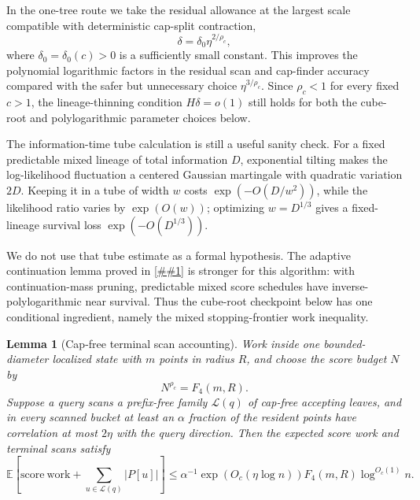 \documentclass[10pt]{article}
\newcommand{\cref}[1]{\ref{##1}}
\newtheorem{lemma}[theorem]{Lemma}
\theoremstyle{definition}
\newcommand{\E}{\mathbb{E}}
\begin{document}
In the one-tree route we take the residual allowance at the largest scale compatible with deterministic cap-split contraction,
\[
   \delta=\delta_0\eta^{2/\rho_c},
\]
where $\delta_0=\delta_0(c)>0$ is a sufficiently small constant. This improves the polynomial logarithmic factors in the residual scan and cap-finder accuracy compared with the safer but unnecessary choice $\eta^{3/\rho_c}$. Since $\rho_c<1$ for every fixed $c>1$, the lineage-thinning condition $H\delta=o(1)$ still holds for both the cube-root and polylogarithmic parameter choices below.

The information-time tube calculation is still a useful sanity check. For a fixed predictable mixed lineage of total information $D$, exponential tilting makes the log-likelihood fluctuation a centered Gaussian martingale with quadratic variation $2D$. Keeping it in a tube of width $w$ costs $\exp(-O(D/w^2))$, while the likelihood ratio varies by $\exp(O(w))$; optimizing $w=D^{1/3}$ gives a fixed-lineage survival loss $\exp(-O(D^{1/3}))$.

We do not use that tube estimate as a formal hypothesis. The adaptive continuation lemma proved in \cref{lem:adaptive-continuation} is stronger for this algorithm: with continuation-mass pruning, predictable mixed score schedules have inverse-polylogarithmic near survival. Thus the cube-root checkpoint below has one conditional ingredient, namely the mixed stopping-frontier work inequality.

\begin{lemma}[Cap-free terminal scan accounting]\label{lem:cap-free-scan-accounting}
   Work inside one bounded-diameter localized state with $m$ points in radius $R$, and choose the score budget $N$ by
   \[
      N^{\rho_c}=F_4(m,R).
   \]
   Suppose a query scans a prefix-free family $\mathcal L(q)$ of cap-free accepting leaves, and in every scanned bucket at least an $\alpha$ fraction of the resident points have correlation at most $2\eta$ with the query direction. Then the expected score work and terminal scans satisfy
   \[
      \E\left[
         \mathrm{score\ work}
         +
         \sum_{u\in\mathcal L(q)} |P[u]|
      \right]
      \le
      \alpha^{-1}
      \exp(O_c(\eta\log n))
      F_4(m,R)\log^{O_c(1)}n.
   \]
\end{lemma}
\end{document}
